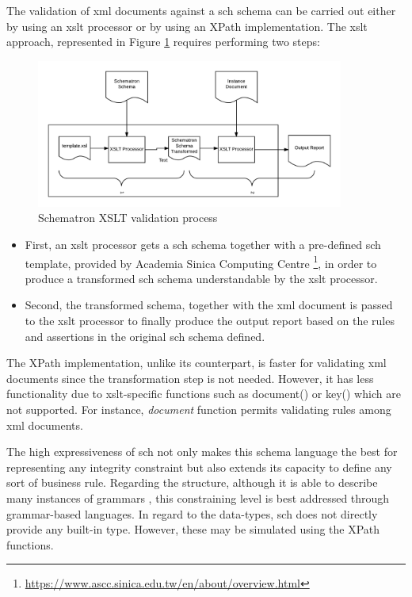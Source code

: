 	The validation of \gls{xml} documents against a \gls{sch} schema can be carried out either by using an \gls{xslt} \cite{web:w3cxslt} processor or by using an XPath implementation. The \gls{xslt} approach, represented in Figure \ref{fig:background:sch_xslt_processor} requires performing two steps:

	\begin{figure}[H]
	\centering
	\includegraphics[width=0.90\textwidth]{background/img/sch_xslt_processor.png}
	\caption{Schematron XSLT validation process}
	\label{fig:background:sch_xslt_processor}
	\end{figure}

	\begin{itemize}
		\item First, an \gls{xslt} processor gets a \gls{sch} schema together with a pre-defined \gls{sch} template, provided by Academia Sinica Computing Centre \footnote{\url{https://www.ascc.sinica.edu.tw/en/about/overview.html}}, in order to produce a transformed \gls{sch} schema understandable by the \gls{xslt} processor.
		\item Second, the transformed schema, together with the \gls{xml} document is passed to the \gls{xslt} processor to finally produce the output report based on the rules and assertions in the original \gls{sch} schema defined.
	\end{itemize}

	The XPath implementation, unlike its counterpart, is faster for validating \gls{xml} documents since the transformation step is not needed. However, it has less functionality due to \gls{xslt}-specific functions such as document() or key() which are not supported. For instance, \emph{document} function permits validating rules among \gls{xml} documents.

	The high expressiveness of \gls{sch} not only makes this schema language the best for representing any integrity constraint \cite{art:murata05} but also extends its capacity to define any sort of business rule. Regarding the structure, although it is able to describe many instances of grammars \cite{web:jellife07}, this constraining level is best addressed through grammar-based languages. In regard to the data-types, \gls{sch} does not directly provide any built-in type. However, these may be simulated using the XPath functions.